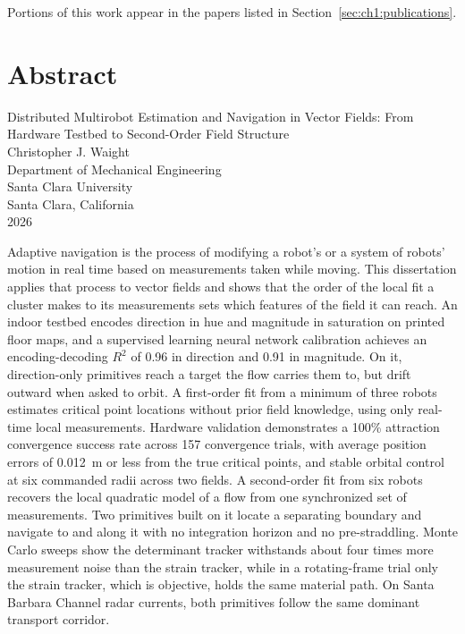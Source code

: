 \documentclass[12pt, letterpaper, oneside]{report}
\newcommand{\thesistitle}{Distributed Multirobot Estimation and Navigation in Vector Fields: From Hardware Testbed to Second-Order Field Structure}
\newcommand{\thesisauthor}{Christopher J. Waight}
\newcommand{\thesisdepartment}{Mechanical Engineering}
\newcommand{\thesisyear}{2026}
\begin{document}
Portions of this work appear in the papers listed in
Section~\ref{sec:ch1:publications}.

\clearpage

\chapter*{Abstract}

\begin{center}
  \thesistitle \\[6pt]
  \thesisauthor \\[6pt]
  Department of \thesisdepartment \\
  Santa Clara University \\
  Santa Clara, California \\
  \thesisyear
\end{center}

\vspace{0.4in}

\noindent
Adaptive navigation is the process of modifying a robot's or a system of
robots' motion in real time based on measurements taken while moving. This
dissertation applies that process to vector fields and shows that the
order of the local fit a cluster makes to its measurements sets which
features of the field it can reach. An indoor testbed encodes direction in
hue and magnitude in saturation on printed floor maps, and a supervised
learning neural network calibration achieves an encoding-decoding $R^2$ of
0.96 in direction and 0.91 in magnitude. On it, direction-only primitives
reach a target the flow carries them to, but drift outward when asked to
orbit. A first-order fit from a minimum of three robots estimates critical
point locations without prior field knowledge, using only real-time local
measurements. Hardware validation demonstrates a 100\% attraction
convergence success rate across 157 convergence trials, with average
position errors of 0.012~m or less from the true critical points, and
stable orbital control at six commanded radii across two fields. A
second-order fit from six robots recovers the local quadratic model of a
flow from one synchronized set of measurements. Two primitives built on it
locate a separating boundary and navigate to and along it with no
integration horizon and no pre-straddling. Monte Carlo sweeps show the
determinant tracker withstands about four times more measurement noise
than the strain tracker, while in a rotating-frame trial only the strain
tracker, which is objective, holds the same material path. On Santa
Barbara Channel radar currents, both primitives follow the same dominant
transport corridor.
\end{document}
